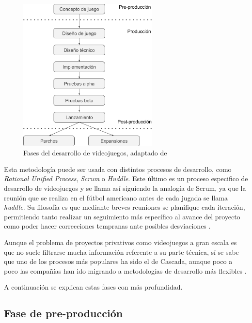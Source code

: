 \begin{figure}[!h]
    \begin{center}
        \includegraphics[width=0.625\textwidth]{imagenes/5/pre-prod-post.png}
        \caption{Fases del desarrollo de videojuegos, adaptado de \cite{man-14}}
        \label{fig:fases-desarrollo}
    \end{center}
\end{figure}

Esta metodología puede ser usada con distintos procesos de desarrollo, como \textit{Rational Unified Process}, \textit{Scrum} o \textit{Huddle}. Este último es un proceso especifico de desarrollo de videojuegos y se llama así siguiendo la analogía de Scrum, ya que la reunión que se realiza en el fútbol americano antes de cada jugada se llama \textit{huddle}. Su filosofía es que mediante breves reuniones se planifique cada iteración, permitiendo tanto realizar un seguimiento más específico al avance del proyecto como poder hacer correcciones tempranas ante posibles desviaciones \cite{mor-10}.

Aunque el problema de proyectos privativos como videojuegos a gran escala es que no suele filtrarse mucha información referente a su parte técnica, sí se sabe que uno de los procesos más populares ha sido el de Cascada, aunque poco a poco las compañías han ido migrando a metodologías de desarrollo más flexibles \cite{mor-10}.

A continuación se explican estas fases con más profundidad.

\subsection{Fase de pre-producción}

